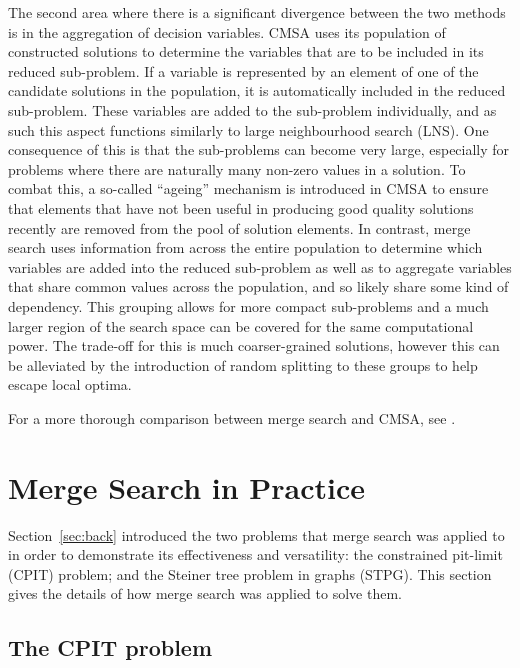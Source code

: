 \documentclass[preprint]{elsarticle}
\begin{document}
The second area where there is a significant divergence between the two methods is in the aggregation of decision variables. CMSA uses its population of constructed solutions to determine the variables that are to be included in its reduced sub-problem. If a variable is represented by an element of one of the candidate solutions in the population, it is automatically included in the reduced sub-problem. These variables are added to the sub-problem individually, and as such this aspect functions similarly to large neighbourhood search (LNS). One consequence of this is that the sub-problems can become very large, especially for problems where there are naturally many non-zero values in a solution. To combat this, a so-called ``ageing'' mechanism is introduced in CMSA to ensure that elements that have not been useful in producing good quality solutions recently are removed from the pool of solution elements. In contrast, merge search uses information from across the entire population to determine which variables are added into the reduced sub-problem as well as to aggregate variables that share common values across the population, and so likely share some kind of dependency. This grouping allows for more compact sub-problems and a much larger region of the search space can be covered for the same computational power. The trade-off for this is much coarser-grained solutions, however this can be alleviated by the introduction of random splitting to these groups to help escape local optima.

For a more thorough comparison between merge search and CMSA, see \citet{ms-vs-cmsa}.

\section{Merge Search in Practice}\label{sec:pract}
Section~\ref{sec:back} introduced the two problems that merge search was applied to in order to demonstrate its effectiveness and versatility: the constrained pit-limit (CPIT) problem; and the Steiner tree problem in graphs (STPG). This section gives the details of how merge search was applied to solve them.

\subsection{The CPIT problem}
\end{document}
